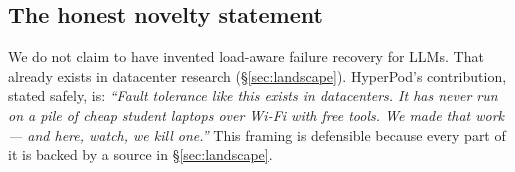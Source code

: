 \subsection{The honest novelty statement}
We do not claim to have invented load-aware failure recovery for LLMs. That
already exists in datacenter research (\S\ref{sec:landscape}). HyperPod's
contribution, stated safely, is: \emph{``Fault tolerance like this exists in
datacenters. It has never run on a pile of cheap student laptops over Wi-Fi with
free tools. We made that work --- and here, watch, we kill one.''} This framing
is defensible because every part of it is backed by a source in
\S\ref{sec:landscape}.
